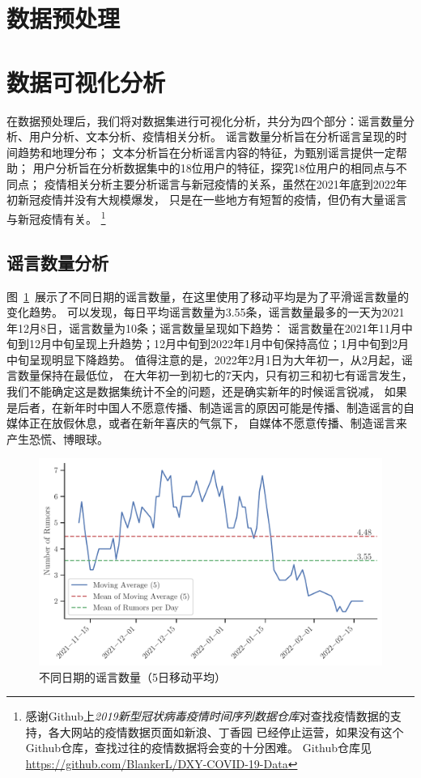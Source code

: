\documentclass[UTF8]{ctexart}
\begin{document}
\clearpage
\makecover

\pagebreak

\tableofcontents

\pagebreak
{}

\section{数据预处理}


\section{数据可视化分析}

在数据预处理后，我们将对数据集进行可视化分析，共分为四个部分：谣言数量分析、用户分析、文本分析、疫情相关分析。
谣言数量分析旨在分析谣言呈现的时间趋势和地理分布；
文本分析旨在分析谣言内容的特征，为甄别谣言提供一定帮助；
用户分析旨在分析数据集中的18位用户的特征，探究18位用户的相同点与不同点；
疫情相关分析主要分析谣言与新冠疫情的关系，虽然在2021年底到2022年初新冠疫情并没有大规模爆发，
只是在一些地方有短暂的疫情，但仍有大量谣言与新冠疫情有关。
\footnote{感谢Github上\textit{2019新型冠状病毒疫情时间序列数据仓库}对查找疫情数据的支持，各大网站的疫情数据页面如新浪、丁香园
已经停止运营，如果没有这个Github仓库，查找过往的疫情数据将会变的十分困难。
Github仓库见
\url{https://github.com/BlankerL/DXY-COVID-19-Data}}

\subsection{谣言数量分析}


图~\ref{fig:rumor_num_ma5}~展示了不同日期的谣言数量，在这里使用了移动平均是为了平滑谣言数量的变化趋势。
可以发现，每日平均谣言数量为3.55条，谣言数量最多的一天为2021年12月8日，谣言数量为10条；谣言数量呈现如下趋势：
谣言数量在2021年11月中旬到12月中旬呈现上升趋势；12月中旬到2022年1月中旬保持高位；1月中旬到2月中旬呈现明显下降趋势。
值得注意的是，2022年2月1日为大年初一，从2月起，谣言数量保持在最低位，
在大年初一到初七的7天内，只有初三和初七有谣言发生，我们不能确定这是数据集统计不全的问题，还是确实新年的时候谣言锐减，
如果是后者，在新年时中国人不愿意传播、制造谣言的原因可能是传播、制造谣言的自媒体正在放假休息，或者在新年喜庆的气氛下，
自媒体不愿意传播、制造谣言来产生恐慌、博眼球。

\begin{figure}[!ht]
    \centering
    \includegraphics[width=0.6\linewidth]{../figures/rumor_num_ma5}
    \caption{不同日期的谣言数量（5日移动平均）}
    \label{fig:rumor_num_ma5}
\end{figure}
\end{document}
